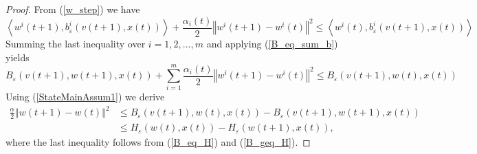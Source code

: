 \documentclass[11pt]{article}
\numberwithin{equation}{section}
\newcommand{\norm}[1]{\left\Vert {#1} \right\Vert} %
\begin{document}
\begin{proof}
From (\ref{w_step}) we have
\begin{equation*}
	\left\langle w^i(t+1),b^i_{\varepsilon}(v(t+1),x(t))\right\rangle + \frac{\alpha_i(t)}{2}\norm{w^i(t+1)-w^i(t)}^2 \leq \left\langle w^i(t),b^i_{\varepsilon}(v(t+1),x(t))\right\rangle
\end{equation*}
Summing the last inequality over $i=1,2,\ldots,m$ and applying (\ref{B_eq_sum_b}) yields
\begin{equation*}
	B_{\varepsilon}(v(t+1),w(t+1),x(t)) + \sum\limits_{i=1}^m \frac{\alpha_i(t)}{2}\norm{w^i(t+1)-w^i(t)}^2 \leq B_{\varepsilon}(v(t+1),w(t),x(t))
\end{equation*}
Using (\ref{StateMainAssum1}) we derive 
\begin{align}
	\frac{\underline{\alpha}}{2}\norm{w(t+1)-w(t)}^2 &\leq B_{\varepsilon}(v(t+1),w(t),x(t)) - B_{\varepsilon}(v(t+1),w(t+1),x(t)) \\
	&\leq H_{\varepsilon}(w(t),x(t)) - H_{\varepsilon}(w(t+1),x(t)), \label{SD_in_w}
\end{align}
where the last inequality follows from (\ref{B_eq_H}) and (\ref{B_geq_H}).


\end{proof}
\end{document}
